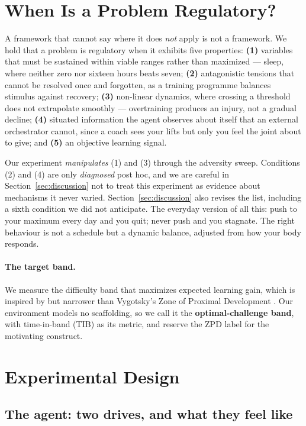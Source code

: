 \documentclass{article}
\begin{document}
\section{When Is a Problem Regulatory?}
\label{sec:regulatory}

A framework that cannot say where it does \emph{not} apply is not a framework. We hold that a problem is regulatory when it exhibits five properties: \textbf{(1)} variables that must be sustained within viable ranges rather than maximized --- sleep, where neither zero nor sixteen hours beats seven; \textbf{(2)} antagonistic tensions that cannot be resolved once and forgotten, as a training programme balances stimulus against recovery; \textbf{(3)} non-linear dynamics, where crossing a threshold does not extrapolate smoothly --- overtraining produces an injury, not a gradual decline; \textbf{(4)} situated information the agent observes about itself that an external orchestrator cannot, since a coach sees your lifts but only you feel the joint about to give; and \textbf{(5)} an objective learning signal.

Our experiment \emph{manipulates} (1) and (3) through the adversity sweep. Conditions (2) and (4) are only \emph{diagnosed} post hoc, and we are careful in Section~\ref{sec:discussion} not to treat this experiment as evidence about mechanisms it never varied. Section~\ref{sec:discussion} also revises the list, including a sixth condition we did not anticipate. The everyday version of all this: push to your maximum every day and you quit; never push and you stagnate. The right behaviour is not a schedule but a dynamic balance, adjusted from how your body responds.

\paragraph{The target band.} We measure the difficulty band that maximizes expected learning gain, which is inspired by but narrower than Vygotsky's Zone of Proximal Development \cite{Vygotsky1978}. Our environment models no scaffolding, so we call it the \textbf{optimal-challenge band}, with time-in-band (TIB) as its metric, and reserve the ZPD label for the motivating construct.

\section{Experimental Design}

\subsection{The agent: two drives, and what they feel like}
\end{document}
